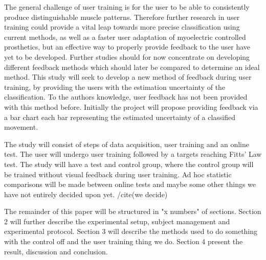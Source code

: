 The general challenge of user training is for the user to be able to consistently produce distinguishable muscle patterns. \cite{Powell2014} Therefore further research in user training could provide a vital leap towards more precise classification using current methods, as well as a faster user adaptation of myoelectric controlled prosthetics, but an effective way to properly provide feedback to the user have yet to be developed. 
Further studies should for now concentrate on developing different feedback methods which should later be compared to determine an ideal method. 
This study will seek to develop a new method of feedback during user training, by providing the users with the estimation uncertainty of the classification. To the authors knowledge, user feedback has not been provided with this method before. Initially the project will propose providing feedback via a bar chart each bar representing the estimated uncertainty of a classified movement. 


 The study will consist of steps of data acquisition, user training and an online test. The user will undergo user training followed by a targets reaching Fitts' Law test. The study will have a test and control group, where the control group will be trained without visual feedback during user training. Ad hoc statistic comparisons will be made between online tests and maybe some other things we have not entirely decided upon yet. /cite(we decide)


The remainder of this paper will be structured in "x numbers" of sections. Section 2 will further describe the experimental setup, subject management and experimental protocol. Section 3 will describe the methods used to do something with the control off and the user training thing we do. Section 4 present the result, discussion and conclusion. 

